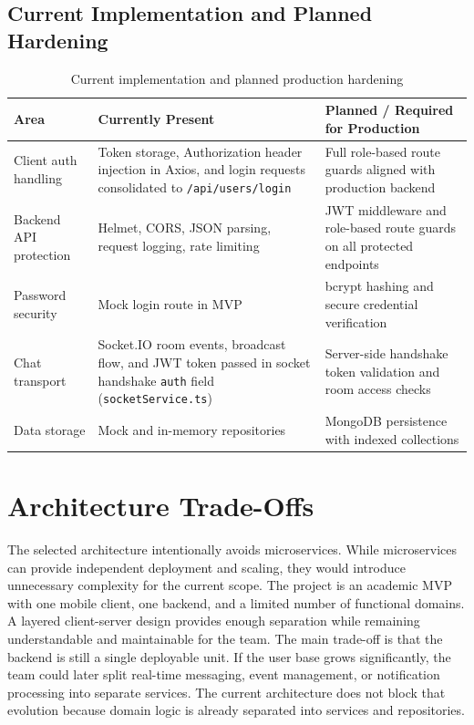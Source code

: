 \documentclass[12pt,a4paper]{article}
\begin{document}
\subsection{Current Implementation and Planned Hardening}
\begin{table}[H]
\centering
\caption{Current implementation and planned production hardening}
\begin{tabularx}{\textwidth}{@{}l X X@{}}
\toprule
\textbf{Area} & \textbf{Currently Present} & \textbf{Planned / Required for Production} \\
\midrule
Client auth handling &
  Token storage, Authorization header injection in Axios, and login
  requests consolidated to \texttt{/api/users/login} &
  Full role-based route guards aligned with production backend \\
Backend API protection &
  Helmet, CORS, JSON parsing, request logging, rate limiting &
  JWT middleware and role-based route guards on all protected endpoints \\
Password security &
  Mock login route in MVP &
  bcrypt hashing and secure credential verification \\
Chat transport &
  Socket.IO room events, broadcast flow, and JWT token passed in
  socket handshake \texttt{auth} field (\texttt{socketService.ts}) &
  Server-side handshake token validation and room access checks \\
Data storage &
  Mock and in-memory repositories &
  MongoDB persistence with indexed collections \\
\bottomrule
\end{tabularx}
\end{table}
\section{Architecture Trade-Offs}
The selected architecture intentionally avoids microservices. While microservices can
provide independent deployment and scaling, they would introduce unnecessary complexity
for the current scope. The project is an academic MVP with one mobile client, one
backend, and a limited number of functional domains. A layered client-server design
provides enough separation while remaining understandable and maintainable for the
team.
The main trade-off is that the backend is still a single deployable unit. If the user base
grows significantly, the team could later split real-time messaging, event management,
or notification processing into separate services. The current architecture does not block
that evolution because domain logic is already separated into services and repositories.
\end{document}
